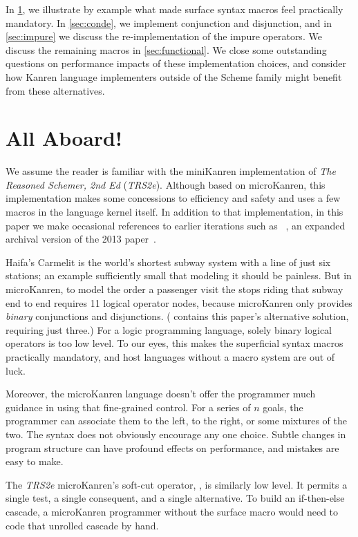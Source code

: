 \documentclass[sigplan,draft,balance,pbalance,natbib=false]{acmart}
\begin{document}
In \cref{sec:all-aboard}, we illustrate by example what made surface
syntax macros feel practically mandatory. In \cref{sec:conde}, we
implement conjunction and disjunction, and in \cref{sec:impure} we
discuss the re-implementation of the impure operators. We discuss the
remaining macros in \cref{sec:functional}. We close some outstanding
questions on performance impacts of these implementation choices, and
consider how Kanren language implementers outside of the Scheme family
might benefit from these alternatives.

\section{All Aboard!}\label{sec:all-aboard}

We assume the reader is familiar with the miniKanren implementation of
\emph{The Reasoned Schemer, 2nd Ed} (\emph{TRS2e}). Although based on
microKanren, this implementation makes some concessions to efficiency
and safety and uses a few macros in the language kernel itself. In
addition to that implementation, in this paper we make occasional
references to earlier iterations such as
\citeauthor{hemann2016small}~\cite{hemann2016small}, an expanded
archival version of the 2013 paper~\cite{hemann2013muKanren}.

Haifa's Carmelit is the world's shortest subway system with a line of
just six stations; an example sufficiently small that modeling it
should be painless. But in microKanren, to model the order a passenger
visit the stops riding that subway end to end requires 11 logical
operator nodes, because microKanren only provides \emph{binary}
conjunctions and disjunctions. ( contains this
paper's alternative solution, requiring just three.) For a logic
programming language, solely binary logical operators is too low
level. To our eyes, this makes the superficial syntax macros
practically mandatory, and host languages without a macro system are
out of luck.

Moreover, the microKanren language doesn't offer the programmer much
guidance in using that fine-grained control. For a series of $n$
goals, the programmer can associate them to the left, to the right, or
some mixtures of the two. The syntax does not obviously encourage any
one choice. Subtle changes in program structure can have profound
effects on performance, and mistakes are easy to make.

The \emph{TRS2e} microKanren's soft-cut operator, ,
is similarly low level. It permits a single test, a single consequent,
and a single alternative. To build an if-then-else cascade, a
microKanren programmer without the  surface macro
would need to code that unrolled cascade by hand.
\end{document}
